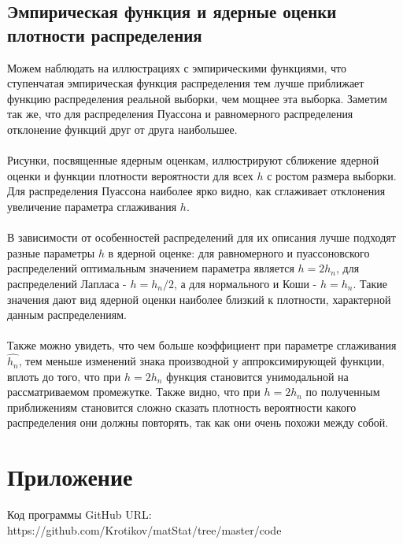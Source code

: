 \documentclass[a4paper]{article}
\begin{document}
\subsection{Эмпирическая функция и ядерные оценки плотности распределения}

\noindent Можем наблюдать на иллюстрациях с эмпирическими функциями, что ступенчатая эмпирическая функция распределения тем лучше приближает функцию распределения реальной выборки, чем мощнее эта выборка. Заметим так же, что для распределения Пуассона и равномерного распределения отклонение функций друг от друга наибольшее.\\\\

\noindent Рисунки, посвященные ядерным оценкам, иллюстрируют сближение ядерной оценки и функции плотности вероятности для всех $h$ с ростом размера выборки. Для распределения Пуассона наиболее ярко видно, как сглаживает отклонения увеличение параметра сглаживания $h$.\\\\

\noindent В зависимости от особенностей распределений для их описания лучше подходят разные параметры $h$ в ядерной оценке: для равномерного и пуассоновского распределений оптимальным значением параметра является $h=2h_n$, для распределений Лапласа - $h=h_n/2$, а для нормального и Коши - $h = h_n$. Такие значения дают вид ядерной оценки наиболее близкий к плотности, характерной данным распределениям.\\\\

\noindent Также можно увидеть, что чем больше коэффициент при параметре сглаживания $\hat{h_n}$, тем меньше изменений знака производной у аппроксимирующей функции, вплоть до того, что при $h=2h_n$ функция становится унимодальной на рассматриваемом промежутке. Также видно, что при $h=2h_n$ по полученным приближениям становится сложно сказать плотность вероятности какого распределения они должны повторять, так как они очень похожи между собой.


\section{Приложение}

\noindent Код программы GitHub URL:\\
\newline https://github.com/Krotikov/matStat/tree/master/code
\end{document}
